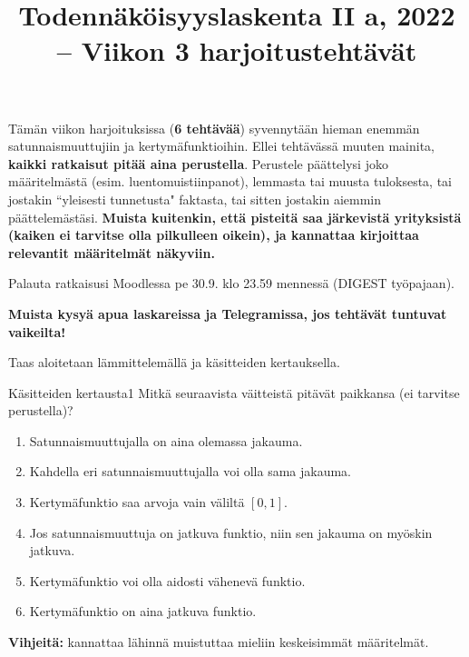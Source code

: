 \documentclass[11pt,a4paper]{amsart}
\title{Todennäköisyyslaskenta II a, 2022 -- Viikon 3 harjoitustehtävät}
\newcommand{\1}{\mathbf{1}}
\begin{document}
\maketitle

Tämän viikon harjoituksissa ({\bf 6 tehtävää}) syvennytään hieman enemmän satunnaismuuttujiin ja kertymäfunktioihin. Ellei tehtävässä muuten mainita,  {\bf kaikki ratkaisut pitää aina perustella}. Perustele päättelysi joko määritelmästä (esim. luentomuistiinpanot), lemmasta tai muusta tuloksesta, tai jostakin ``yleisesti tunnetusta" faktasta, tai sitten jostakin aiemmin päättelemästäsi. {\bf Muista kuitenkin, että pisteitä saa järkevistä yrityksistä (kaiken ei tarvitse olla pilkulleen oikein), ja kannattaa kirjoittaa relevantit määritelmät näkyviin.}

Palauta ratkaisusi Moodlessa pe 30.9. klo 23.59 mennessä (DIGEST työpajaan).

\medskip

 {\bf Muista kysyä apua laskareissa ja Telegramissa, jos tehtävät tuntuvat vaikeilta!}


\medskip 

Taas aloitetaan lämmittelemällä ja käsitteiden kertauksella. 
\begin{Exercises}{Käsitteiden kertausta}{1}
Mitkä seuraavista väitteistä pitävät paikkansa (ei tarvitse perustella)? 
\begin{enumerate}
\item  Satunnaismuuttujalla on aina olemassa jakauma. 


\item Kahdella eri satunnaismuuttujalla voi olla sama jakauma.


\item Kertymäfunktio saa arvoja vain väliltä $[0,1]$.


\item Jos satunnaismuuttuja on jatkuva funktio, niin sen jakauma on myöskin jatkuva.


\item Kertymäfunktio voi olla aidosti vähenevä funktio.


\item Kertymäfunktio on aina jatkuva funktio.

\end{enumerate}
{\bf Vihjeitä:} kannattaa lähinnä muistuttaa mieliin keskeisimmät määritelmät. 
\end{Exercises}
\end{document}
